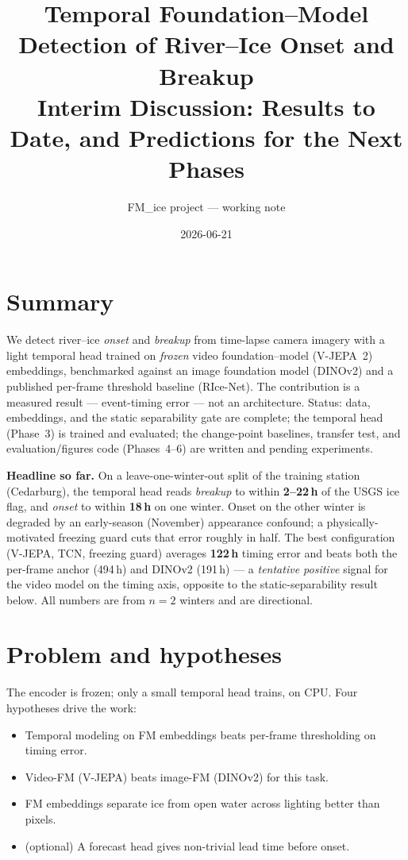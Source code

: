 \documentclass[11pt]{article}
\title{\vspace{-2.5em}Temporal Foundation--Model Detection of River--Ice Onset and Breakup\\[2pt]
\large Interim Discussion: Results to Date, and Predictions for the Next Phases}
\author{FM\_ice project --- working note}
\date{2026-06-21}
\newcommand{\hh}[1]{\textbf{\color{black!80}#1}}
\begin{document}
\maketitle
\vspace{-1.5em}

\section*{Summary}
We detect river--ice \emph{onset} and \emph{breakup} from time-lapse camera imagery with a
light temporal head trained on \emph{frozen} video foundation--model (V-JEPA~2) embeddings,
benchmarked against an image foundation model (DINOv2) and a published per-frame threshold
baseline (RIce-Net). The contribution is a measured result --- event-timing error --- not an
architecture. Status: data, embeddings, and the static separability gate are complete; the
temporal head (Phase~3) is trained and evaluated; the change-point baselines, transfer test,
and evaluation/figures code (Phases~4--6) are written and pending experiments.

\textbf{Headline so far.} On a leave-one-winter-out split of the training station (Cedarburg),
the temporal head reads \emph{breakup} to within \textbf{2--22\,h} of the USGS ice flag, and
\emph{onset} to within \textbf{18\,h} on one winter. Onset on the other winter is degraded by an
early-season (November) appearance confound; a physically-motivated freezing guard cuts that
error roughly in half. The best configuration (V-JEPA, TCN, freezing guard) averages
\textbf{122\,h} timing error and beats both the per-frame anchor (494\,h) and DINOv2 (191\,h) ---
a \emph{tentative positive} signal for the video model on the timing axis, opposite to the
static-separability result below. All numbers are from $n=2$ winters and are directional.

\section{Problem and hypotheses}
The encoder is frozen; only a small temporal head trains, on CPU. Four hypotheses drive the work:
\begin{itemize}\itemsep1pt
\item[\hh{H1}] Temporal modeling on FM embeddings beats per-frame thresholding on timing error.
\item[\hh{H2}] Video-FM (V-JEPA) beats image-FM (DINOv2) for this task.
\item[\hh{H3}] FM embeddings separate ice from open water across lighting better than pixels.
\item[\hh{H4}] (optional) A forecast head gives non-trivial lead time before onset.
\end{itemize}
\end{document}

